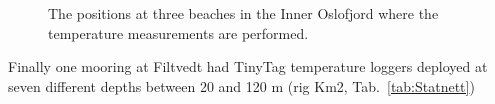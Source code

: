 \begin{figure}[htb]
{\begin{minipage}[r]{0.4\textwidth}
		 \\
		 \\
	\end{minipage}
	}
    \caption{\small The positions at three beaches in the Inner Oslofjord where the temperature measurements are performed.}
    \label{fig:kart_strand}
\end{figure}

Finally one mooring at Filtvedt had TinyTag temperature loggers deployed at seven different depths between 20 and 120 m (rig Km2, Tab.~\ref{tab:Statnett})

